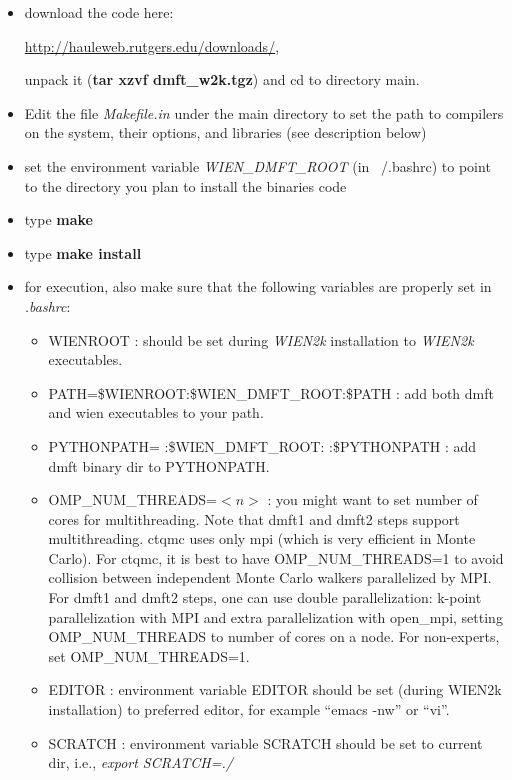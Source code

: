 \documentclass[12 pt]{article}
\begin{document}
{\color{cyan}
  \begin{itemize}

  \item download the code here: 

  \url{http://hauleweb.rutgers.edu/downloads/}, 

  unpack it (\textbf{tar xzvf dmft\_w2k.tgz}) and cd to directory main.

  \item Edit the file \emph{Makefile.in} under the main directory to set the path to compilers on the system, their 
options, and libraries (see description below)

  \item set the environment variable \emph{WIEN\_DMFT\_ROOT} (in ~/.bashrc) to point to the directory you plan to 
install the binaries code

  \item type \textbf{make}

  \item type \textbf{make install}

  \item for execution, also make sure that the following variables are properly set in \emph{.bashrc}:

    \begin{itemize}

    \item WIENROOT : should be set during \emph{WIEN2k} installation to \emph{WIEN2k} executables.

    \item PATH=\$WIENROOT:\$WIEN\_DMFT\_ROOT:\$PATH : add both dmft and wien executables to your path.

    \item PYTHONPATH= :\$WIEN\_DMFT\_ROOT: :\$PYTHONPATH : add dmft binary dir to PYTHONPATH.

    \item OMP\_NUM\_THREADS=$<n>$ : you might want to set number of cores for multithreading. Note that dmft1 and 
dmft2 steps support multithreading. ctqmc uses only mpi (which is very efficient in Monte Carlo). For ctqmc, it is 
best to have OMP\_NUM\_THREADS=1 to avoid collision between independent Monte Carlo walkers parallelized by MPI. For 
dmft1 and dmft2 steps, one can use double parallelization: k-point parallelization with MPI and extra parallelization 
with open\_mpi, setting OMP\_NUM\_THREADS to number of cores on a node. For non-experts, set OMP\_NUM\_THREADS=1.

    \item EDITOR : environment variable EDITOR should be set (during WIEN2k installation) to preferred editor, for 
example ``emacs -nw'' or ``vi''.

    \item SCRATCH : environment variable SCRATCH should be set to current dir, i.e., \emph{export SCRATCH=./}

    \end{itemize}

  \end{itemize}
}
\end{document}
